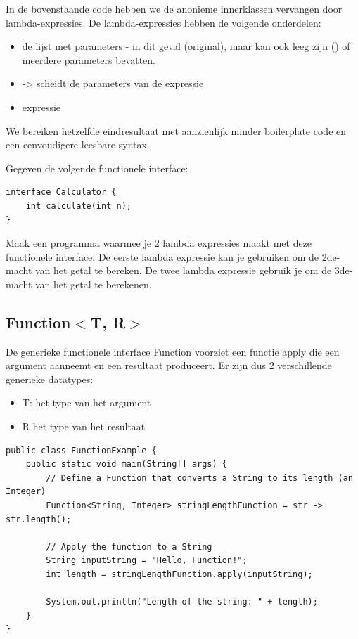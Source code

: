 In de bovenstaande code hebben we de anonieme innerklassen vervangen door  lambda-expressies.  De lambda-expressies hebben de volgende onderdelen:

\begin{itemize}
\item de lijst met parameters - in dit geval (original), maar kan ook leeg zijn () of meerdere parameters bevatten.
\item -> scheidt de parameters van de expressie
\item expressie
\end{itemize}

We bereiken hetzelfde eindresultaat met aanzienlijk minder boilerplate code en een eenvoudigere leesbare syntax.


\begin{oefening}
Gegeven de volgende functionele interface:

\begin{lstlisting}
interface Calculator {
    int calculate(int n);
}
\end{lstlisting}

Maak een programma waarmee je 2 lambda expressies maakt met deze functionele interface. De eerste lambda expressie kan je gebruiken om de 2de-macht van het getal te bereken. De twee lambda expressie gebruik je om de 3de-macht van het getal te berekenen.
\end{oefening}

\subsection{Function$<$T, R$>$}

De generieke functionele interface Function voorziet een functie apply die een argument aanneemt en een resultaat produceert. Er zijn dus 2 verschillende generieke datatypes:
\begin{itemize}
\item T: het type van het argument 
\item R het type van het resultaat
\end{itemize}

\begin{lstlisting}
public class FunctionExample {
    public static void main(String[] args) {
        // Define a Function that converts a String to its length (an Integer)
        Function<String, Integer> stringLengthFunction = str -> str.length();

        // Apply the function to a String
        String inputString = "Hello, Function!";
        int length = stringLengthFunction.apply(inputString);

        System.out.println("Length of the string: " + length);
    }
}
\end{lstlisting}


